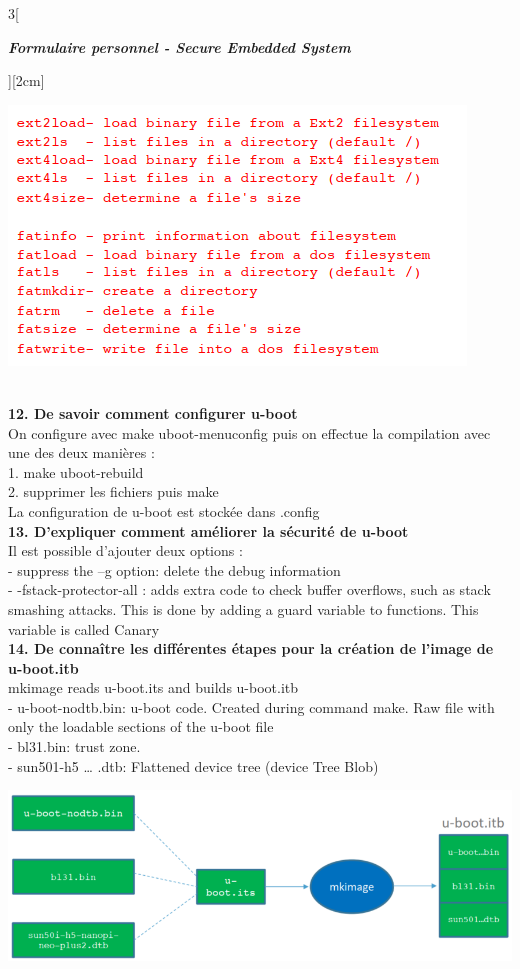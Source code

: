 \begin{multicols}{3}[\centerline{ \large\em \textbf{Formulaire personnel - Secure Embedded System}}][2cm]
\begin{minipage}{\linewidth}
	\centering
    \includegraphics[width =0.6\columnwidth]{images/9.png}
\end{minipage}
\\ \textbf{12. De savoir comment configurer u-boot\\}
On configure avec make uboot-menuconfig puis on effectue la compilation avec une des deux manières :\\
1. make uboot-rebuild\\
2. supprimer les fichiers puis make\\
La configuration de u-boot est stockée dans .config
\\ \textbf{13. D’expliquer comment améliorer la sécurité de u-boot\\}
Il est possible d'ajouter deux options :\\
- suppress the –g option: delete the debug information\\
- -fstack-protector-all : adds extra code to check buffer overflows, such as stack smashing attacks. This is done by adding a guard variable to functions. This variable is called Canary
\\ \textbf{14. De connaître les différentes étapes pour la création de l’image de u-boot.itb\\}
mkimage reads u-boot.its and builds u-boot.itb\\
- u-boot-nodtb.bin: u-boot code. Created during command make. Raw file with only the loadable sections of the u-boot file\\
- bl31.bin: trust zone.\\
- sun501-h5 … .dtb: Flattened device tree (device Tree Blob)\\
\begin{minipage}{\linewidth}
	\centering
    \includegraphics[width =0.8\columnwidth]{images/13.png}

\end{minipage}
\end{multicols}
